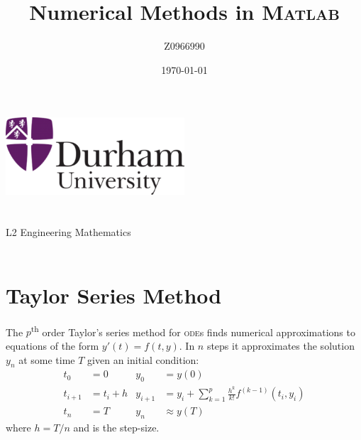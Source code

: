 \documentclass[a4paper,12pt,twocolumn]{article}
\author{Z0966990}
\title{Numerical Methods in \textsc{Matlab}\textsuperscript{\textregistered}}
\date{\today}
\begin{document}
    
\begin{titlepage}
    \centering
    \vspace*{\fill}
    \includegraphics[width=0.5\textwidth]{Durham.png}\\
    \vspace*{\fill}
    \LARGE\thetitle\\
    \large\theauthor\\
    \large L2 Engineering Mathematics\\
    \large\thedate\\
    \vspace*{\fill}
\end{titlepage}


\section{Taylor Series Method}

The $p$\textsuperscript{th} order Taylor's series method for \textsc{ode}s finds
numerical approximations to equations of the form $y'(t) = f(t,y)$. In $n$ steps
it approximates the solution $y_n$ at some time $T$ given an initial condition:
{\footnotesize
\begin{equation} \label{eq:taylor-method}
    \begin{aligned}
        t_0 &= 0 &
        y_0 &= y(0) \\
        t_{i+1} &= t_i + h &
        y_{i+1} &= y_i + \sum_{k=1}^{p}\frac{h^k}{k!}f^{(k-1)}(t_i,y_i) \\
        t_n &= T &
        y_n &\approx y(T) 
    \end{aligned}
\end{equation}
}where $h = T/n$ and is the step-size.
\end{document}
